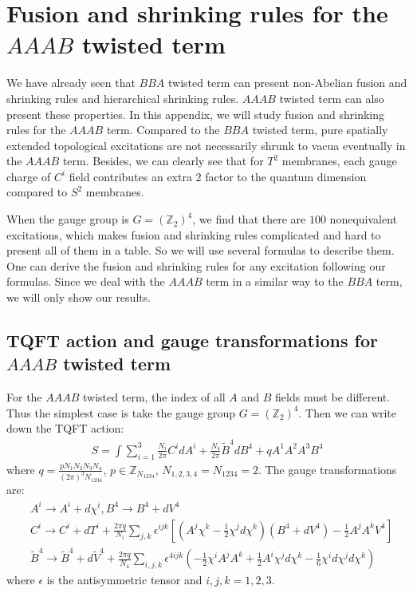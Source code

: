 \documentclass[11pt,nofootinbib,preprint]{revtex4-1}
\begin{document}
\section{Fusion and shrinking rules for the $AAAB$ twisted term\label{ap4}}
We have already seen that $BBA$ twisted term can present non-Abelian fusion and shrinking rules and hierarchical shrinking rules. $AAAB$ twisted term can also present these properties. In this appendix, we will study fusion and shrinking rules for the $AAAB$ term. Compared to the $BBA$ twisted term, pure spatially extended topological excitations are not necessarily shrunk to vacua eventually in the $AAAB$ term. Besides, we can clearly see that for $T^2$ membranes, each gauge charge of $C^i$ field contributes an extra $2$ factor to the quantum dimension compared to $S^2$ membranes.

When the gauge group is $G={\left( \mathbb{Z} _{2} \right)}^4$, we find that there are $100$ nonequivalent excitations, which makes fusion and shrinking rules complicated and hard to present all of them in a table. So we will use several formulas to describe them. One can derive the fusion and shrinking rules for any excitation following our formulas. Since we deal with the $AAAB$ term in a similar way to the $BBA$ term, we will only show our results. 
\subsection{TQFT action and gauge transformations for $AAAB$ twisted term}
For the $AAAB$ twisted term, the index of all $A$ and $B$ fields must be different. Thus the simplest case is take the gauge group $G={\left( \mathbb{Z} _{2} \right)}^4$. Then we can write down the TQFT action:
\begin{align}
	S=\int{\sum_{i=1}^3{\frac{N_i}{2\pi}C^idA^i}+}\frac{N_4}{2\pi}\tilde{B}^4dB^4+qA^1A^2A^3B^4
\end{align}
where $q=\frac{pN_1N_2N_3N_4}{\left( 2\pi \right) ^3N_{1234}}$, $p\in \mathbb{Z} _{N_{1234}}$, $N_{1,2,3,4}=N_{1234}=2$. The gauge transformations are:
\begin{align}
	&A^i\rightarrow A^i+d\chi ^i,B^4\rightarrow B^4+dV^4
	\label{eq21}
	\\
	&C^i\rightarrow C^i+dT^i+\frac{2\pi q}{N_i}\sum_{j,k}{\epsilon ^{ijk}}\left[ \left( A^j\chi ^k-\frac{1}{2}\chi ^jd\chi ^k \right) \left( B^4+dV^4 \right) -\frac{1}{2}A^jA^kV^4 \right] 
	\\
	&\tilde{B}^4\rightarrow \tilde{B}^4+d\tilde{V}^4+\frac{2\pi q}{N_4}\sum_{i,j,k}{\epsilon ^{4ijk}}\left( -\frac{1}{2}\chi ^iA^jA^k+\frac{1}{2}A^i\chi ^jd\chi ^k-\frac{1}{6}\chi ^id\chi ^jd\chi ^k \right) 
\end{align}
where $\epsilon$ is the antisymmetric tensor and $i,j,k=1,2,3$.
\end{document}
